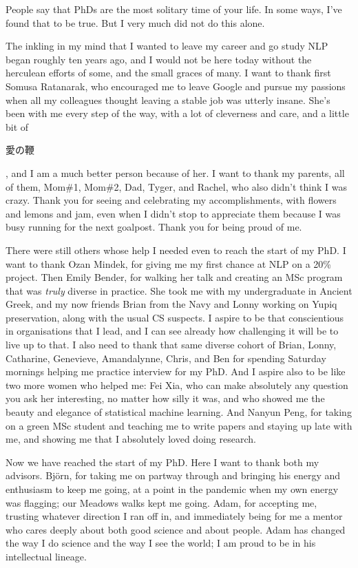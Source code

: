 \documentclass[phd,ilcc,oneside,leftchapter,parskip]{infthesis}
\begin{document}
\begin{preliminary}
\begin{laysummary}
\end{laysummary}

\begin{acknowledgements}
People say that PhDs are the most solitary time of your life. In some ways, I've found that to be true. But I very much did not do this alone. 

The inkling in my mind that I wanted to leave my career and go study NLP began roughly ten years ago, and I would not be here today without the herculean efforts of some, and the small graces of many. I want to thank first Somusa Ratanarak, who encouraged me to leave Google and pursue my passions when all my colleagues thought leaving a stable job was utterly insane. She's been with me every step of the way, with a lot of cleverness and care, and a little bit of \begin{CJK*}{UTF8}{ipxm} 愛の鞭 \end{CJK*}, 
and I am a much better person because of her. I want to thank my parents, all of them, Mom\#1, Mom\#2, Dad, Tyger, and Rachel, who also didn't think I was crazy. Thank you for seeing and celebrating my accomplishments, with flowers and lemons and jam, even when I didn't stop to appreciate them because I was busy running for the next goalpost. Thank you for being proud of me.

There were still others whose help I needed even to reach the start of my PhD. I want to thank Ozan Mindek, for giving me my first chance at NLP on a 20\% project. Then Emily Bender, for walking her talk and creating an MSc program that was \textit{truly} diverse in practice. She took me with my undergraduate in Ancient Greek, and my now friends Brian from the Navy and Lonny working on Yupiq preservation, along with the usual CS suspects. I aspire to be that conscientious in organisations that I lead, and I can see already how challenging it will be to live up to that. I also need to thank that same diverse cohort of Brian, Lonny, Catharine, Genevieve, Amandalynne, Chris, and Ben for spending Saturday mornings helping me practice interview for my PhD.
And I aspire also to be like two more women who helped me: Fei Xia, who can make absolutely any question you ask her interesting, no matter how silly it was, and who showed me the beauty and elegance of statistical machine learning. And Nanyun Peng, for taking on a green MSc student and teaching me to write papers and staying up late with me, and showing me that I absolutely loved doing research. 

Now we have reached the start of my PhD. Here I want to thank both my advisors. Björn, for taking me on partway through and bringing his energy and enthusiasm to keep me going, at a point in the pandemic when my own energy was flagging; our Meadows walks kept me going. Adam, for accepting me, trusting whatever direction I ran off in, and immediately being for me a mentor who cares deeply about both good science and about people. Adam has changed the way I do science and the way I see the world; I am proud to be in his intellectual lineage. 


\end{acknowledgements}
\end{preliminary}
\end{document}

